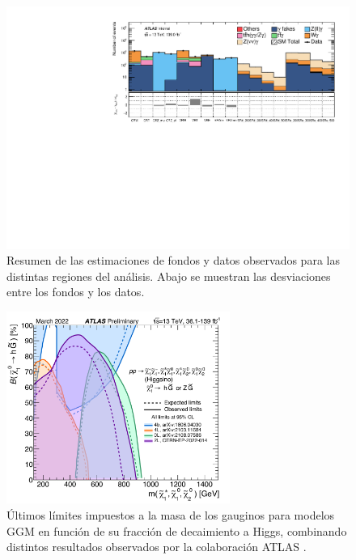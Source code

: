 \begin{figure}[ht!]
  \centering

    \includegraphics[width=\textwidth]{images/analysis_EWK/v192_1_nosyst/regions_pull.pdf}

    \caption{Resumen de las estimaciones de fondos y datos observados para las distintas regiones del análisis. Abajo se muestran las desviaciones entre los fondos y los datos.}
    \label{fig:pull_ewk}

\end{figure}

\begin{figure}[ht!]
  \centering

    \includegraphics[width=0.65\textwidth]{images/analysis_EWK/actual_limits.png}

    \caption{Últimos límites impuestos a la masa de los gauginos para modelos GGM en función de su fracción de decaimiento a Higgs, combinando distintos resultados observados por la colaboración ATLAS \cite{susy_public_results}.}
    \label{fig:ewk_limits}

\end{figure}


